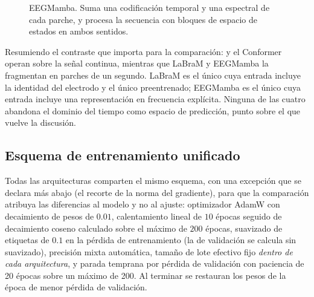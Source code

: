 \begin{figure}[H]
\centering
{}
\caption{EEGMamba. Suma una codificación temporal y una espectral de cada parche, y procesa
la secuencia con bloques de espacio de estados en ambos sentidos.}
\label{fig:arq-eegmamba}
\end{figure}

Resumiendo el contraste que importa para la comparación: \eegnet{} y el Conformer operan
sobre la señal continua, mientras que LaBraM y EEGMamba la fragmentan en parches de un
segundo. LaBraM es el único cuya entrada incluye la identidad del electrodo y el único preentrenado;
EEGMamba es el único cuya entrada incluye una representación en frecuencia explícita. Ninguna de las
cuatro abandona el dominio del tiempo como espacio de predicción, punto sobre el que vuelve
la discusión.

\subsection{Esquema de entrenamiento unificado}

Todas las arquitecturas comparten el mismo esquema, con una excepción que se declara
más abajo (el recorte de la norma del gradiente), para que la comparación
atribuya las diferencias al modelo y no al ajuste: optimizador AdamW
\cite{loshchilov2019adamw} con decaimiento de pesos de $0.01$,
calentamiento lineal de $10$ épocas seguido de decaimiento coseno calculado sobre el
máximo de $200$ épocas, suavizado de etiquetas de $0.1$ en la pérdida de entrenamiento
(la de validación se calcula sin suavizado),
precisión mixta automática, tamaño de lote efectivo fijo \emph{dentro de cada
arquitectura}, y parada temprana por pérdida de validación con paciencia de 20 épocas
sobre un máximo de 200. Al terminar se restauran los pesos de la época de menor pérdida
de validación.

